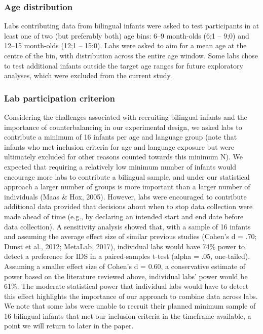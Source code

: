 \documentclass[
  english,
  ,man,floatsintext]{apa6}
\begin{document}
\hypertarget{age-distribution}{%
\subsubsection{Age distribution}\label{age-distribution}}

Labs contributing data from bilingual infants were asked to test participants in at least one of two (but preferably both) age bins: 6--9 month-olds (6;1 -- 9;0) and 12--15 month-olds (12;1 -- 15;0). Labs were asked to aim for a mean age at the centre of the bin, with distribution across the entire age window. Some labs chose to test additional infants outside the target age ranges for future exploratory analyses, which were excluded from the current study.

\hypertarget{lab-participation-criterion}{%
\subsubsection{Lab participation criterion}\label{lab-participation-criterion}}

Considering the challenges associated with recruiting bilingual infants and the importance of counterbalancing in our experimental design, we asked labs to contribute a minimum of 16 infants per age and language group (note that infants who met inclusion criteria for age and language exposure but were ultimately excluded for other reasons counted towards this minimum N). We expected that requiring a relatively low minimum number of infants would encourage more labs to contribute a bilingual sample, and under our statistical approach a larger number of groups is more important than a larger number of individuals (Maas \& Hox, 2005). However, labs were encouraged to contribute additional data provided that decisions about when to stop data collection were made ahead of time (e.g., by declaring an intended start and end date before data collection). A sensitivity analysis showed that, with a sample of 16 infants and assuming the average effect size of similar previous studies (Cohen's d = .70; Dunst et al., 2012; MetaLab, 2017), individual labs would have 74\% power to detect a preference for IDS in a paired-samples t-test (alpha = .05, one-tailed). Assuming a smaller effect size of Cohen's d = 0.60, a conservative estimate of power based on the literature reviewed above, individual labs' power would be 61\%. The moderate statistical power that individual labs would have to detect this effect highlights the importance of our approach to combine data across labs. We note that some labs were unable to recruit their planned minimum sample of 16 bilingual infants that met our inclusion criteria in the timeframe available, a point we will return to later in the paper.
\end{document}
